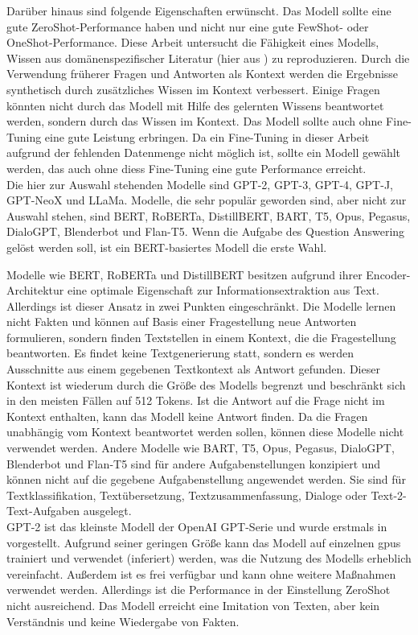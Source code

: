 Darüber hinaus sind folgende Eigenschaften erwünscht.
Das Modell sollte eine gute ZeroShot-Performance haben und nicht nur eine gute FewShot- oder OneShot-Performance.
Diese Arbeit untersucht die Fähigkeit eines Modells, Wissen aus domänenspezifischer Literatur (hier aus \citet{bb}) zu reproduzieren.
Durch die Verwendung früherer Fragen und Antworten als Kontext werden die Ergebnisse synthetisch durch zusätzliches Wissen im Kontext verbessert.
Einige Fragen könnten nicht durch das Modell mit Hilfe des gelernten Wissens beantwortet werden, sondern durch das Wissen im Kontext.
Das Modell sollte auch ohne Fine-Tuning eine gute Leistung erbringen.
Da ein Fine-Tuning in dieser Arbeit aufgrund der fehlenden Datenmenge nicht möglich ist, sollte ein Modell gewählt werden, das auch ohne diess Fine-Tuning eine gute Performance erreicht.\\

Die hier zur Auswahl stehenden Modelle sind GPT-2, GPT-3, GPT-4, GPT-J, GPT-NeoX und LLaMa.
Modelle, die sehr populär geworden sind, aber nicht zur Auswahl stehen, sind BERT, RoBERTa, DistillBERT, BART, T5, Opus, Pegasus, DialoGPT, Blenderbot und Flan-T5.
Wenn die Aufgabe des Question Answering gelöst werden soll, ist ein BERT-basiertes Modell die erste Wahl.

Modelle wie BERT, RoBERTa und DistillBERT besitzen aufgrund ihrer Encoder-Architektur eine optimale Eigenschaft zur Informationsextraktion aus Text.
Allerdings ist dieser Ansatz in zwei Punkten eingeschränkt.
Die Modelle lernen nicht Fakten und können auf Basis einer Fragestellung neue Antworten formulieren, sondern finden Textstellen in einem Kontext, die die Fragestellung beantworten.
Es findet keine Textgenerierung statt, sondern es werden Ausschnitte aus einem gegebenen Textkontext als Antwort gefunden.
Dieser Kontext ist wiederum durch die Größe des Modells begrenzt und beschränkt sich in den meisten Fällen auf 512 Tokens.
Ist die Antwort auf die Frage nicht im Kontext enthalten, kann das Modell keine Antwort finden.
Da die Fragen unabhängig vom Kontext beantwortet werden sollen, können diese Modelle nicht verwendet werden.
Andere Modelle wie BART, T5, Opus, Pegasus, DialoGPT, Blenderbot und Flan-T5 sind für andere Aufgabenstellungen konzipiert und können nicht auf die gegebene Aufgabenstellung angewendet werden.
Sie sind für Textklassifikation, Textübersetzung, Textzusammenfassung, Dialoge oder Text-2-Text-Aufgaben ausgelegt.\\

GPT-2 ist das kleinste Modell der OpenAI GPT-Serie und wurde erstmals in \citet{gpt2} vorgestellt.
Aufgrund seiner geringen Größe kann das Modell auf einzelnen \ac{gpu}s trainiert und verwendet (inferiert) werden, was die Nutzung des Modells erheblich vereinfacht.
Außerdem ist es frei verfügbar und kann ohne weitere Maßnahmen verwendet werden.
Allerdings ist die Performance in der Einstellung ZeroShot nicht ausreichend.
Das Modell erreicht eine Imitation von Texten, aber kein Verständnis und keine Wiedergabe von Fakten.\\

